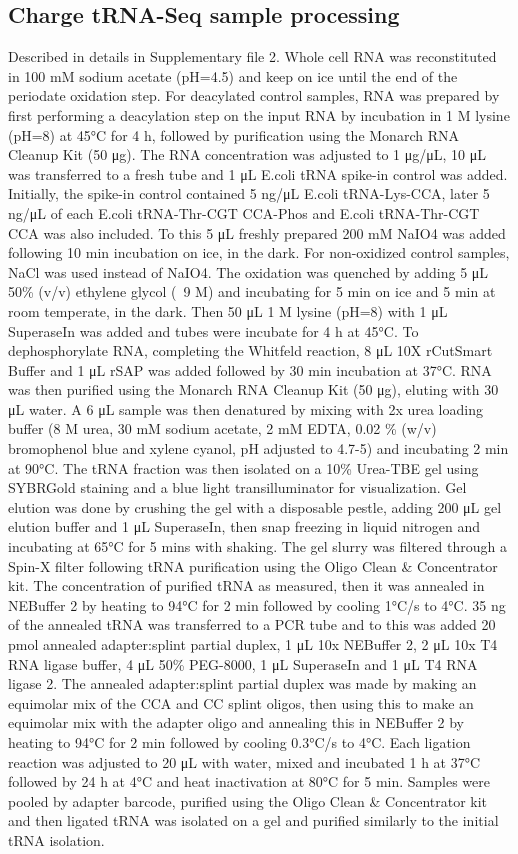 \documentclass[9pt,lineno]{elife}
\begin{document}
\subsection{Charge tRNA-Seq sample processing}
Described in details in Supplementary file 2.
Whole cell RNA was reconstituted in 100 mM sodium acetate (pH=4.5) and keep on ice until the end of the periodate oxidation step.
For deacylated control samples, RNA was prepared by first performing a deacylation step on the input RNA by incubation in 1 M lysine (pH=8) at 45°C for 4 h, followed by purification using the Monarch RNA Cleanup Kit (50 μg).
The RNA concentration was adjusted to 1 μg/μL, 10 μL was transferred to a fresh tube and 1 μL E.coli tRNA spike-in control was added.
Initially, the spike-in control contained 5 ng/μL E.coli tRNA-Lys-CCA, later 5 ng/μL of each E.coli tRNA-Thr-CGT CCA-Phos and E.coli tRNA-Thr-CGT CCA was also included.
To this 5 μL freshly prepared 200 mM NaIO4 was added following 10 min incubation on ice, in the dark.
For non-oxidized control samples, NaCl was used instead of NaIO4.
The oxidation was quenched by adding 5 μL 50\% (v/v) ethylene glycol (~9 M) and incubating for 5 min on ice and 5 min at room temperate, in the dark.
Then 50 μL 1 M lysine (pH=8) with 1 μL SuperaseIn was added and tubes were incubate for 4 h at 45°C.
To dephosphorylate RNA, completing the Whitfeld reaction, 8 μL 10X rCutSmart Buffer and 1 μL rSAP was added followed by 30 min incubation at 37°C.
RNA was then purified using the Monarch RNA Cleanup Kit (50 μg), eluting with 30 μL water.
A 6 μL sample was then denatured by mixing with 2x urea loading buffer (8 M urea, 30 mM sodium acetate, 2 mM EDTA, 0.02 \% (w/v) bromophenol blue and xylene cyanol, pH adjusted to 4.7-5) and incubating 2 min at 90°C.
The tRNA fraction was then isolated on a 10\% Urea-TBE gel using SYBRGold staining and a blue light transilluminator for visualization.
Gel elution was done by crushing the gel with a disposable pestle, adding 200 μL gel elution buffer and 1 μL SuperaseIn, then snap freezing in liquid nitrogen and incubating at 65°C for 5 mins with shaking.
The gel slurry was filtered through a Spin-X filter following tRNA purification using the Oligo Clean \& Concentrator kit.
The concentration of purified tRNA as measured, then it was annealed in  NEBuffer 2 by heating to 94°C for 2 min followed by cooling 1°C/s to 4°C.
35 ng of the annealed tRNA was transferred to a PCR tube and to this was added 20 pmol annealed adapter:splint partial duplex, 1 μL 10x NEBuffer 2, 2 μL 10x T4 RNA ligase buffer, 4 μL 50\% PEG-8000, 1 μL SuperaseIn and 1 μL T4 RNA ligase 2.
The annealed adapter:splint partial duplex was made by making an equimolar mix of the CCA and CC splint oligos, then using this to make an equimolar mix with the adapter oligo and annealing this in NEBuffer 2 by heating to 94°C for 2 min followed by cooling 0.3°C/s to 4°C.
Each ligation reaction was adjusted to 20 μL with water, mixed and incubated 1 h at 37°C followed by 24 h at 4°C and heat inactivation at 80°C for 5 min.
Samples were pooled by adapter barcode, purified using the Oligo Clean \& Concentrator kit and then ligated tRNA was isolated on a gel and purified similarly to the initial tRNA isolation.
\end{document}
